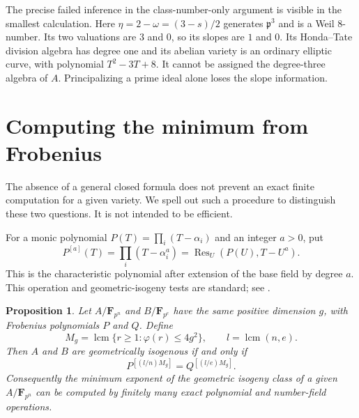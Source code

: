 \documentclass[11pt,a4paper]{article}
\newcommand{\F}{\mathbf F}
\newcommand{\pp}{\mathfrak p}
\newtheorem{proposition}[theorem]{Proposition}
\theoremstyle{definition}
\theoremstyle{remark}
\begin{document}
The precise failed inference in the class-number-only argument is
visible in the smallest calculation. Here
$\eta=2-\omega=(3-s)/2$ generates $\pp^3$ and is a Weil
$8$-number. Its two valuations are $3$ and $0$, so its slopes are
$1$ and $0$. Its Honda--Tate division algebra has degree one and
its abelian variety is an ordinary elliptic curve, with polynomial
$T^2-3T+8$. It cannot be assigned the degree-three algebra of
$A$. Principalizing a prime ideal alone loses the slope information.



\section{Computing the minimum from Frobenius}\label{sec:algorithm}

The absence of a general closed formula does not prevent an exact
finite computation for a given variety. We spell out such a procedure
to distinguish these two questions. It is not intended to be efficient.

For a monic polynomial $P(T)=\prod_i(T-\alpha_i)$ and an integer
$a>0$, put
\[
 P^{[a]}(T)=\prod_i(T-\alpha_i^a)
           =\operatorname{Res}_U(P(U),T-U^a).
\]
This is the characteristic polynomial after extension of the base
field by degree $a$. This operation and geometric-isogeny tests are
standard; see \citet[\S3.4, pp.~14--15]{DKRV2020}.

\begin{proposition}\label{prop:finite-test}
Let $A/\F_{p^n}$ and $B/\F_{p^e}$ have the same positive dimension
$g$, with Frobenius polynomials $P$ and $Q$. Define
\[
 M_g=\operatorname{lcm}\{r\ge1:\varphi(r)\le4g^2\},
 \qquad l=\operatorname{lcm}(n,e).
\]
Then $A$ and $B$ are geometrically isogenous if and only if
\begin{equation}\label{eq:finite-test}
       P^{[(l/n)M_g]}=Q^{[(l/e)M_g]}.
\end{equation}
Consequently the minimum exponent of the geometric isogeny class
of a given $A/\F_{p^n}$ can be computed by finitely many exact
polynomial and number-field operations.
\end{proposition}
\end{document}
